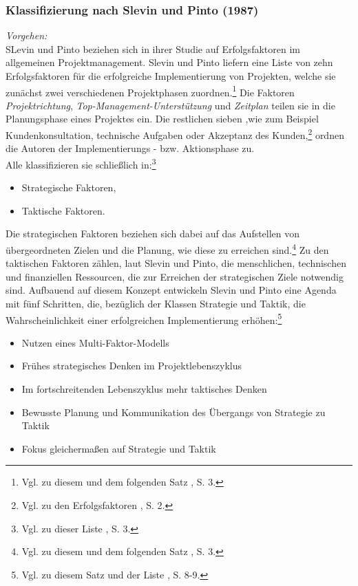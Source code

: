 \noindent
\subsubsection{Klassifizierung nach Slevin und Pinto (1987)}
\textit{Vorgehen:}\\\noindent
SLevin und Pinto beziehen sich in ihrer Studie auf Erfolgsfaktoren im allgemeinen Projektmanagement.
Slevin und Pinto liefern eine Liste von zehn Erfolgsfaktoren für die erfolgreiche Implementierung
von Projekten, welche sie zunächst zwei verschiedenen Projektphasen zuordnen.\footnote{Vgl. zu diesem und dem folgenden Satz \cite{Slevin.1987}, S. 3.} 
Die Faktoren \textit{Projektrichtung}, \textit{Top-Management-Unterstützung} und \textit{Zeitplan} teilen sie in die Planungsphase eines Projektes ein. 
Die restlichen sieben \EF,wie zum Beispiel Kundenkonsultation, technische Aufgaben oder Akzeptanz des 
Kunden,\footnote{Vgl. zu den Erfolgsfaktoren \cite{Slvein.1987}, S. 2.} ordnen die Autoren der Implementierungs - 
bzw. Aktionsphase zu.\\\noindent
Alle \EF klassifizieren sie schließlich in:\footnote{Vgl. zu dieser Liste \cite{Slevin.1987}, S. 3.}
\begin{itemize}\itemsep0pt
\item[-]Strategische Faktoren,
\item[-]Taktische Faktoren.
\end{itemize}
Die strategischen Faktoren beziehen sich dabei auf das Aufstellen von übergeordneten Zielen und die Planung, wie diese zu erreichen sind.\footnote{Vgl. zu diesem und dem folgenden Satz \cite{Slevin.1987}, S. 3.}
Zu den taktischen Faktoren zählen, laut Slevin und Pinto, die menschlichen, technischen und finanziellen Ressourcen, die zur Erreichen der
strategischen Ziele notwendig sind. Aufbauend auf diesem Konzept entwickeln Slevin und Pinto eine Agenda mit fünf Schritten, die, bezüglich
der Klassen Strategie und Taktik, die Wahrscheinlichkeit einer erfolgreichen Implementierung erhöhen:\footnote{Vgl. zu diesem Satz und der Liste \cite{Slevin.1987}, S. 8-9.}
\begin{itemize}\itemsep0pt
\item[1.]Nutzen eines Multi-Faktor-Modells
\item[2.]Frühes strategisches Denken im Projektlebenszyklus
\item[3.]Im fortschreitenden Lebenszyklus mehr taktisches Denken
\item[4.]Bewusste Planung und Kommunikation des Übergangs von Strategie zu Taktik
\item[5.]Fokus gleichermaßen auf Strategie und Taktik
\end{itemize}
